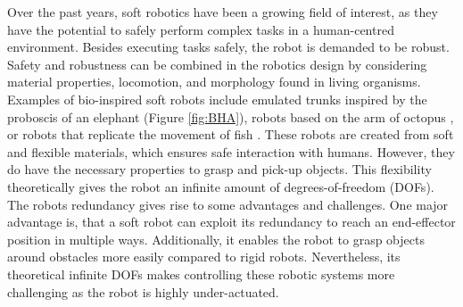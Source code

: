 Over the past years, soft robotics have been a growing field of interest, as they have the potential to safely perform complex tasks in a human-centred environment. Besides executing tasks safely, the robot is demanded to be robust. Safety and robustness can be combined in the robotics design by considering material properties, locomotion, and morphology found in living organisms. Examples of bio-inspired soft robots include emulated trunks \cite{hannan2003kinematics} inspired by the proboscis of an elephant (Figure \ref{fig:BHA}), robots based on the arm of octopus \cite{wang2013visual}, or robots that replicate the movement of fish \cite{marchese2014autonomous}. These robots are created from soft and flexible materials, which ensures safe interaction with humans. However, they do have the necessary properties to grasp and pick-up objects. This flexibility theoretically gives the robot an infinite amount of degrees-of-freedom (DOFs). The robots redundancy gives rise to some advantages and challenges. One major advantage is, that a soft robot can exploit its redundancy to reach an end-effector position in multiple ways. Additionally, it enables the robot to grasp objects around obstacles more easily compared to rigid robots. Nevertheless, its theoretical infinite DOFs makes controlling these robotic systems more challenging as the robot is highly under-actuated. 


